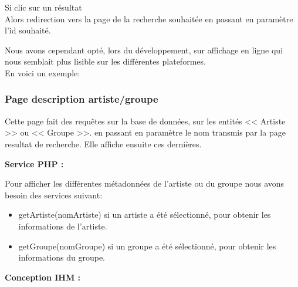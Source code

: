             \begin{paragraphe}
                Si clic sur un résultat\\
                Alors redirection vers la page de la recherche souhaitée en passant en paramètre l'id souhaité.
            \end{paragraphe}

            \begin{paragraphe}
                Nous avons cependant opté, lors du développement, sur affichage en ligne qui nous semblait plus lisible sur les différentes plateformes.\\
                En voici un exemple:
            \end{paragraphe}

        \clearpage

		\subsubsection{Page description artiste/groupe}
            \begin{paragraphe}
                Cette page fait des requêtes sur la base de données, sur les entités << Artiste >> ou << Groupe >>.
                 en passant en paramètre le nom transmis par la page resultat de recherche. Elle affiche ensuite ces dernières.
            \end{paragraphe}

            \begin{paragraphe}
                \textbf{Service PHP :}
            \end{paragraphe}

            \begin{paragraphe}
                Pour afficher les différentes métadonnées de l'artiste ou du groupe nous avons besoin des services suivant:
                \begin{itemize}
                        \item getArtiste(nomArtiste) si un artiste a été sélectionné, pour obtenir les informations de l'artiste.
                        \item getGroupe(nomGroupe) si un groupe a été sélectionné, pour obtenir les informations du groupe.
                \end{itemize}
            \end{paragraphe}

			\begin{paragraphe}
				\textbf{Conception IHM :}
			\end{paragraphe}

